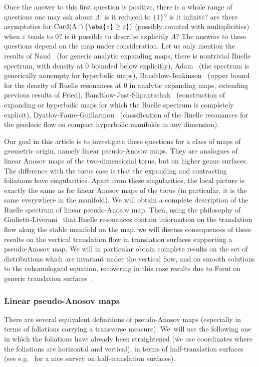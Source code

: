 \documentclass[JEP,XML,SOM,Unicode]{cedram}
\DeclareMathOperator{\Card}{Card}
\let\epsilon\varepsilon
\theoremstyle{definition}
\numberwithin{equation}{section}
\begin{document}
Once the answer to this first question is positive, there is a whole range of
questions one may ask about $\Lambda$: is it reduced to $\{1\}$? is it
infinite? are there asymptotics for $\Card (\Lambda \cap \{\abs{z} \geq
\epsilon\})$ (possibly counted with multiplicities) when $\epsilon$ tends to
$0$? is it possible to describe explicitly $\Lambda$? The answers to these
questions depend on the map under consideration. Let us only mention the
results of Naud~\cite{naud_lower_bound} (for generic analytic expanding maps,
there is nontrivial Ruelle spectrum, with density at $0$ bounded below
explicitly), Adam~\cite{adam_hyperbolic} (the spectrum is generically
nonempty for hyperbolic maps),
Bandtlow-Jenkinson~\cite{bandtlow_jenkinson_upper} (upper bound for the
density of Ruelle resonances at $0$ in analytic expanding maps, extending
previous results of Fried),
Bandtlow-Just-Slipantschuk~\cite{bandtlow_just_slipantschuk_expanding,
bandtlow_just_slipantschuk_hyperbolic} (construction of expanding or
hyperbolic maps for which the Ruelle spectrum is completely explicit),
Dyatlov-Faure-Guillarmou~\cite{dyatlov_faure_guillarmou} (classification of
the Ruelle resonances for the geodesic flow on compact hyperbolic manifolds
in any dimension).

Our goal in this article is to investigate these questions for a class of
maps of geometric origin, namely linear pseudo-Anosov maps. They are analogues of
linear Anosov maps of the two-dimensional torus, but on higher genus
surfaces. The difference with the torus case is that the expanding and
contracting foliations have singularities. Apart from these singularities,
the local picture is exactly the same as for linear Anosov maps of the torus
(in particular, it is the same everywhere in the manifold). We will obtain a
complete description of the Ruelle spectrum of linear pseudo-Anosov map.
Then, using the philosophy of Giulietti-Liverani~\cite{giulietti_liverani}
that Ruelle resonances contain information on the translation flow along the
stable manifold on the map, we will discuss consequences of these results on
the vertical translation flow in translation surfaces supporting a
pseudo-Anosov map. We will in particular obtain complete results on the set
of distributions which are invariant under the vertical flow, and on smooth
solutions to the cohomological equation, recovering in this case results due
to Forni on generic translation surfaces~\cite{forni_cohomological,
forni_deviation, forni_regularity}.

\subsubsection*{Linear pseudo-Anosov maps}
There are several equivalent definitions of pseudo-Anosov maps (especially in
terms of foliations carrying a transverse measure). We~will use the following
one in which the foliations have already been straightened (\ie we use
coordinates where the foliations are horizontal and vertical), in terms of
half-translation surfaces (see e.g.~\cite{zorich} for a nice survey on half-translation surfaces).
\end{document}
